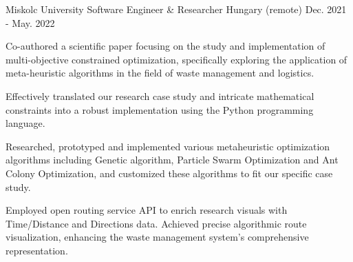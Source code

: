\begin{cventries}
  \cventry
    {Miskolc University 
        }%
    {Software Engineer \& Researcher} %
    {Hungary (remote)} %
    {Dec. 2021 - May. 2022} %
    {
      \begin{cvitems} %
        \item {Co-authored a scientific paper focusing on the study and implementation of multi-objective constrained optimization, specifically exploring the application of meta-heuristic algorithms in the field of waste management and logistics.}
        \item {Effectively translated our research case study and intricate mathematical constraints into a robust implementation using the Python programming language.}
        \item {Researched, prototyped and implemented various metaheuristic optimization algorithms including Genetic algorithm, Particle Swarm Optimization and Ant Colony Optimization, and customized these algorithms to fit our specific case study.}
        \item {Employed open routing service API to enrich research visuals with Time/Distance and Directions data. Achieved precise algorithmic route visualization, enhancing the waste management system's comprehensive representation.}
      \end{cvitems}
    }


\end{cventries}
